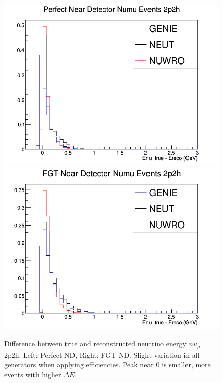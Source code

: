 \documentclass[12pt]{article}
\begin{document}
\begin{figure}[h]
\centering
{}
\includegraphics[width=\linewidth]{Ereco_Etrue/numu_perfect_ND_2p2h.png}
\endminipage
{}
\includegraphics[width=\linewidth]{Ereco_Etrue/numu_FGT_2p2h.png}
\endminipage
\caption{Difference between true and reconstructed neutrino energy $nu_\mu$ 2p2h. Left: Perfect ND, Right: FGT ND. Slight variation in all generators when applying efficiencies. Peak near 0 is smaller, more events with higher $\Delta E$.}
\label{fig:numu_Etrue_ereco_perfect_FGT_2p2h}
\end{figure}
\end{document}
